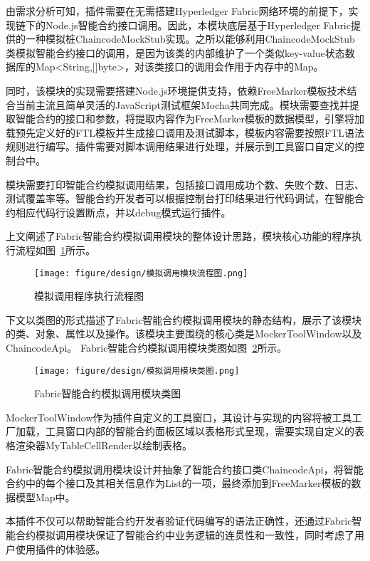由需求分析可知，插件需要在无需搭建Hyperledger Fabric网络环境的前提下，实现链下的Node.js智能合约接口调用。因此，本模块底层基于Hyperledger Fabric提供的一种模拟桩ChaincodeMockStub实现。之所以能够利用ChaincodeMockStub类模拟智能合约接口的调用，是因为该类的内部维护了一个类似key-value状态数据库的Map<String,[]byte>，对该类接口的调用会作用于内存中的Map。

同时，该模块的实现需要搭建Node.js环境提供支持，依赖FreeMarker模板技术结合当前主流且简单灵活的JavaScript测试框架Mocha共同完成。模块需要查找并提取智能合约的接口和参数，将提取内容作为FreeMarker模板的数据模型，引擎将加载预先定义好的FTL模板并生成接口调用及测试脚本，模板内容需要按照FTL语法规则进行编写。插件需要对脚本调用结果进行处理，并展示到工具窗口自定义的控制台中。

模块需要打印智能合约模拟调用结果，包括接口调用成功个数、失败个数、日志、测试覆盖率等。智能合约开发者可以根据控制台打印结果进行代码调试，在智能合约相应代码行设置断点，并以debug模式运行插件。

上文阐述了Fabric智能合约模拟调用模块的整体设计思路，模块核心功能的程序执行流程如图~\ref{fig:3.16}所示。

\begin{figure}[htb]
  \centering
  \texttt{[image: figure/design/模拟调用模块流程图.png]}
  \caption{模拟调用程序执行流程图}\label{fig:3.16}
\end{figure}

下文以类图的形式描述了Fabric智能合约模拟调用模块的静态结构，展示了该模块的类、对象、属性以及操作。该模块主要围绕的核心类是MockerToolWindow以及ChaincodeApi。
Fabric智能合约模拟调用模块类图如图~\ref{fig:3.17}所示。

\begin{figure}[htb]
  \centering
  \texttt{[image: figure/design/模拟调用模块类图.png]}
  \caption{Fabric智能合约模拟调用模块类图}\label{fig:3.17}
\end{figure}

MockerToolWindow作为插件自定义的工具窗口，其设计与实现的内容将被工具工厂加载，工具窗口内部的智能合约面板区域以表格形式呈现，需要实现自定义的表格渲染器MyTableCellRender以绘制表格。

Fabric智能合约模拟调用模块设计并抽象了智能合约接口类ChaincodeApi，将智能合约中的每个接口及其相关信息作为List的一项，最终添加到FreeMarker模板的数据模型Map中。

本插件不仅可以帮助智能合约开发者验证代码编写的语法正确性，还通过Fabric智能合约模拟调用模块保证了智能合约中业务逻辑的连贯性和一致性，同时考虑了用户使用插件的体验感。

